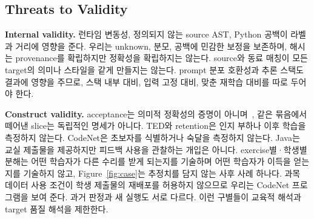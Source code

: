 \documentclass[10pt,conference]{IEEEtran}
\begin{document}
\subsection{Threats to Validity}
\noindent\textbf{Internal validity.} 런타임 변동성, 정의되지 않는 source AST, Python 공백이 라벨과 거리에 영향을 준다. 우리는 unknown, 분모, 공백에 민감한 보정을 보존하며, 해시는 provenance를 확립하지만 정확성을 확립하지는 않는다. source와 동료 매칭이 모든 target의 의미나 스타일을 같게 만들지는 않는다. prompt 분포 호환성과 추론 스택도 결과에 영향을 주므로, 스택 내부 대비, 입력 고정 대비, 맞춘 재학습 대비를 따로 두어야 한다.

\noindent\textbf{Construct validity.} acceptance는 의미적 정확성의 증명이 아니며~\cite{smith2015cure}, 같은 묶음에서 떼어낸 slice는 독립적인 명세가 아니다. TED와 retention은 인지 부하나 이후 학습을 측정하지 않는다. CodeNet은 초보자를 식별하거나 숙달을 측정하지 않는다. Java는 교실 제출물을 제공하지만 피드백 사용을 관찰하는 개입은 아니다. exercise별·학생별 분해는 어떤 학습자가 다른 수리를 받게 되는지를 기술하며 어떤 학습자가 이득을 얻는지를 기술하지 않고, Figure~\ref{fig:case}는 추정치를 담지 않는 사후 사례 하나다. 과목 데이터 사용 조건이 학생 제출물의 재배포를 허용하지 않으므로 우리는 CodeNet 프로그램을 보여 준다. 과거 판정과 새 실행도 서로 다르다. 이런 구별들이 교육적 해석과 target 품질 해석을 제한한다.
\end{document}
